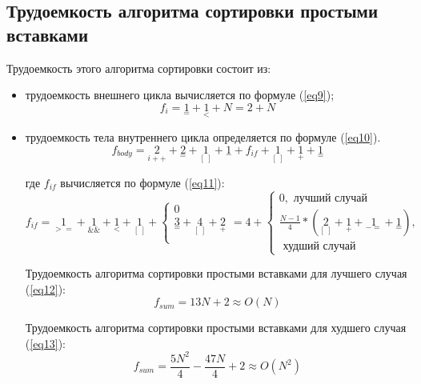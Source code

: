 \subsection{Трудоемкость алгоритма сортировки простыми вставками}
Трудоемкость этого алгоритма сортировки состоит из:
\begin{itemize}
	\item трудоемкость внешнего цикла вычисляется по формуле (\ref{eq9});
	\begin{equation}
		\label{eq9}
		f_{i} = {\underset{=}{1}} + {\underset{<}{1}} + N= 2 + N
	\end{equation}
	
	\item трудоемкость тела внутреннего цикла определяется по формуле (\ref{eq10}).
	\begin{equation}
		\label{eq10} 
		f_{body} = {\underset{i++}{2}} + {\underset{=}{2}} + {\underset{[\ ]}{1}} + {\underset{-}{1}} + f_{if} + {\underset{[\ ]}{1}} + {\underset{+}{1}} + {\underset{=}{1}}
	\end{equation}
	
	где $f_{if}$ вычисляется по формуле (\ref{eq11}):
	\begin{equation}
		\label{eq11}
		f_{if} = {\underset{>=}{1}} + {\underset{\&\&}{1}} + {\underset{<}{1}} + {\underset{[\ ]}{1}} +
		\begin{cases}
			0\\
			{\underset{=}{3}} + {\underset{[\ ]}{4}} +{\underset{+}{2}}\\
		\end{cases}
		= 4 +
		\begin{cases}
			0, \text{  лучший случай}\\
			\frac{N-1}{4} * ({\underset{[\ ]}{2}} + {\underset{+}{1}} + {\underset{-=}{1}} + {\underset{=}{1}}),\\
			\text{  худший случай}
		\end{cases}
	\end{equation}
	
	Трудоемкость алгоритма сортировки простыми вставками для лучшего случая (\ref{eq12}):
	\begin{equation}
		\label{eq12}
		f_{sum} = 13N + 2 \approx O(N)
	\end{equation}
	
	Трудоемкость алгоритма сортировки простыми вставками для худшего случая (\ref{eq13}):
	\begin{equation}
		\label{eq13}
		f_{sum} = \frac{5N^2}{4} - \frac{47N}{4} + 2 \approx O(N^2)
	\end{equation}
\end{itemize}

